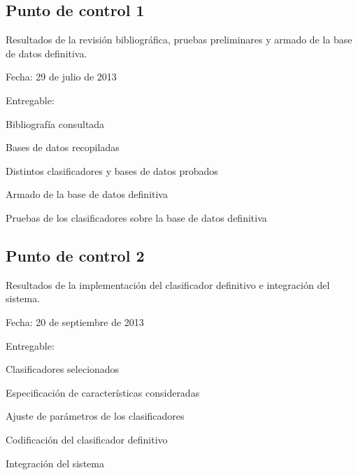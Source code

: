 \documentclass[bibliography=openstyle,DIV=12]{scrartcl}
\begin{document}
\subsection{Punto de control 1}
Resultados de la revisión bibliográfica, pruebas preliminares y armado de la base de datos definitiva.
\begin{description*}
  \item[Fecha:] 29 de julio de 2013
  \item[Entregable:]
  \item
    \begin{minipage}{.8\textwidth}
      \begin{itemize*}
      \item Bibliografía consultada
      \item Bases de datos recopiladas
      \item Distintos clasificadores y bases de datos probados
      \item Armado de la base de datos definitiva
      \item Pruebas de los clasificadores sobre la base de datos definitiva
      \end{itemize*}
    \end{minipage}
\end{description*}
\subsection{Punto de control 2}
Resultados de la implementación del clasificador definitivo e integración del sistema.
\begin{description*}
  \item[Fecha:] 20 de septiembre de 2013
  \item[Entregable:]
  \item
    \begin{minipage}{.8\textwidth}
      \begin{itemize*}
      \item Clasificadores selecionados
      \item Especificación de características consideradas
      \item Ajuste de parámetros de los clasificadores
      \item Codificación del clasificador definitivo
      \item Integración del sistema
      \end{itemize*}
    \end{minipage}
\end{description*}
\end{document}
